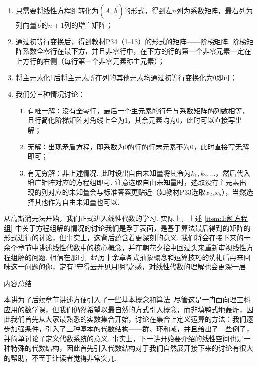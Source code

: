 \begin{enumerate}[label=步骤\arabic*~]
    \item 只需要将线性方程组转化为$(A, \vec{b})$的形式，得到左$n$列为系数矩阵，最右列为列向量$\vec{b}$的$n+1$列的增广矩阵；

    \item 通过初等行变换后，得到教材P34（1--13）的形式的矩阵——阶梯矩阵. 阶梯矩阵系数全零行在最下方，并且非零行中，在下方的行的第一个非零元素一定在上方行的右侧（每行第一个非零元素称主元素）；

    \item 将主元素化1后将主元素所在列的其他元素均通过初等行变换化为0即可；

    \item \label{item:1:解方程组}
          我们分三种情况讨论：
          \begin{enumerate}
              \item 有唯一解：没有全零行，最后一个主元素的行号与系数矩阵的列数相等，且行简化阶梯矩阵对角线上全为1，其余元素均为0，此时可以直接写出解；

              \item 无解：出现矛盾方程，即系数为0的行的行末元素不为0，此时直接写无解即可；

              \item 有无穷解：非上述情况. 此时设出自由未知量将其令为$k_1,k_2,\ldots$，然后代入增广矩阵对应的方程组即可. 注意选取自由未知量时，选取没有主元素出现的列对应的未知量会与标准答案更贴近（如教材P33选取$x_2,x_5$），当然选择其他作为自由未知量也可以.
          \end{enumerate}
\end{enumerate}

从高斯消元法开始，我们正式进入线性代数的学习. 实际上，上述 \ref*{item:1:解方程组} 中关于方程组解的情况的讨论我们是浮于表面，是基于算法最后得到的矩阵的形式进行的讨论，但事实上，这背后蕴含着更深刻的意义. 我们将会在接下来的十余个章节中讲述线性代数中的核心概念，并在\hyperref[chap:朝花夕拾]{朝花夕拾}中回过头来重新审视线性方程组解的问题. 相信在那时，经历十余章各式抽象概念和运算技巧的洗礼后再来回味这一问题的你，定有``守得云开见月明''之感，对线性代数的理解也会更深一层.

\vspace{2ex}
\centerline{\heiti \Large 内容总结}

本讲为了后续章节讲述方便引入了一些基本概念和算法. 尽管这是一门面向理工科应用的数学课，但我们仍然希望以最自然的方式引入概念，而非填鸭式地轰炸，因此我们首先从大家最熟悉的实数集合开始，讨论在集合上定义运算的方法：我们逐步加强条件，引入了三种基本的代数结构——群、环和域，并且给出了一些例子，并简单讨论了定义代数系统的意义. 事实上，下一讲开始要介绍的线性空间也是一种特殊的代数结构，因此首先引入代数结构对于我们自然展开接下来的讨论有很大的帮助，不至于让读者觉得非常突兀.


